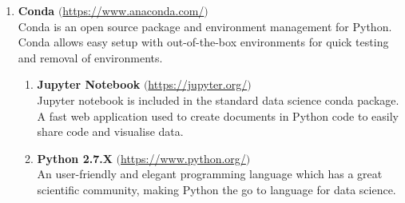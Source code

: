 \begin{enumerate}
    \item \textbf{Conda} $($\url{https://www.anaconda.com/}$)$ \\
    Conda is an open source package and environment management for Python. Conda allows easy setup with out-of-the-box environments for quick testing and removal of environments.
    \begin{enumerate}
        \item \textbf{Jupyter Notebook} $($\url{https://jupyter.org/}$)$ \\
        Jupyter notebook is included in the standard data science conda package. A fast web application used to create documents in Python code to easily share code and visualise data.
        \item \textbf{Python 2.7.X} $($\url{https://www.python.org/}$)$\\
        An user-friendly and elegant programming language which has a great scientific community, making Python the go to language for data science.
    \end{enumerate}
    
\end{enumerate}